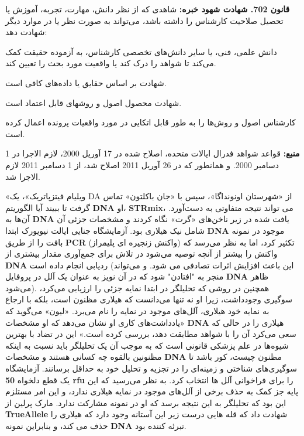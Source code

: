 \begin{tcolorbox}[colback=gray!10,colframe=black,breakable]
    \textbf{قانون 702. شهادت شهود خبره:} شاهدی که از نظر دانش، مهارت، تجربه، آموزش یا تحصیل صلاحیت کارشناس را داشته باشد، می‌تواند به صورت نظر یا در موارد دیگر شهادت دهد:

    \begin{description}[leftmargin=0.5cm,style=nextline]
        \item[الف)] دانش علمی، فنی، یا سایر دانش‌های تخصصی کارشناس، به آزموده حقیقت کمک می‌کند تا شواهد را درک کند یا واقعیت مورد بحث را تعیین کند.
        \item[ب)] شهادت بر اساس حقایق یا داده‌های کافی است.
        \item[ج)] شهادت محصول اصول و روشهای قابل اعتماد است.
        \item[د)] کارشناس اصول و روش‌ها را به طور قابل اتکایی در مورد واقعیات پرونده اعمال کرده است.
    \end{description}

    \textbf{منبع:} قواعد شواهد فدرال ایالات متحده، اصلاح شده در 17 آوریل 2000، لازم الاجرا در 1 دسامبر 2000.
    و همانطور که در 26 آوریل 2011 اصلاح شد، از 1 دسامبر 2011 لازم الاجرا شد.


\end{tcolorbox}


«ویلیام فیتزپاتریک»، یک DA از «شهرستان اونونداگا»، سپس با «جان باکلتون» تماس گرفت تا ببیند آیا الگوریتم \textenglish{\textbf{DNA}} او، \textenglish{\textbf{STRmix}}، می تواند نتیجه متفاوتی به دست‌آورد.
آن‌ها به \textenglish{\textbf{DNA}} یافت شده در زیر ناخن‌های «گرت» نگاه کردند و مشخصات جزئی آن شامل نیک هیلاری بود.
آزمایشگاه جنایی ایالت نیویورک ابتدا \textenglish{\textbf{DNA}} موجود در نمونه بافت را از طریق \textenglish{\textbf{PCR}} (واکنش زنجیره ای پلیمراز) تکثیر کرد، اما به نظر می‌رسد که واکنش را بیشتر از آنچه توصیه می‌شود در تلاش برای جمع‌آوری مقدار بیشتری از \textenglish{\textbf{DNA}} ردیابی انجام داده است (این باعث افزایش اثرات تصادفی می شود.
و می‌تواند منجر به "افتادن" شود که در آن نویز به عنوان یک آلل در پروفایل \textenglish{\textbf{DNA}} ظاهر می‌شود).
همچنین در روشی که تحلیلگر در ابتدا نمایه جزئی را ارزیابی می‌کرد، سوگیری وجود‌داشت، زیرا او نه تنها می‌دانست که هیلاری مظنون است، بلکه با ارجاع به نمایه خود هیلاری، آلل‌های موجود در نمایه را نام می‌برد.
«لیون» می‌گوید که «یادداشت‌های کاری او نشان می‌دهد که او مشخصات \textenglish{\textbf{DNA}} هیلاری را در حالی که سعی می‌کرد آن را با شواهد مطابقت دهد، بررسی کرده است.» این در تضاد با بهترین شیوه‌ها در علم پزشکی قانونی است که به موجب آن یک تحلیلگر باید نسبت به اینکه مظنونین بالقوه چه کسانی هستند و مشخصات \textenglish{\textbf{DNA}} مظنون چیست، کور باشد تا سوگیری‌های شناختی و زمینه‌ای را در تجزیه و تحلیل خود به حداقل برسانند.
آزمایشگاه یک قطع دلخواه \textenglish{\textbf{50 rfu}} را برای فراخوانی آلل ها انتخاب کرد.
به نظر می‌رسید که این پایه جز کمک به حذف برخی از آلل‌های موجود در نمایه هیلاری ندارد، و این امر مستلزم این بود که تحلیلگر به این نتیجه برسد که او در نمونه مشارکت ندارد.
مارک پرلین از \textenglish{\textbf{TrueAllele}} شهادت داد که قله هایی درست زیر این آستانه وجود دارد که هیلاری را حذف می کند، و بنابراین نمونه \textenglish{\textbf{DNA}} تبرئه کننده بود.

